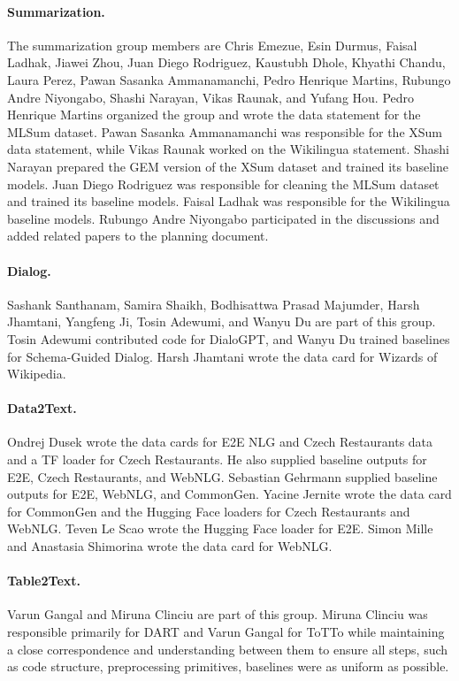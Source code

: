 \documentclass[11pt,a4paper]{article}
\begin{document}
\paragraph{Summarization.}
The summarization group members are Chris Emezue, Esin Durmus, Faisal Ladhak, Jiawei Zhou, Juan Diego Rodriguez, Kaustubh Dhole, Khyathi Chandu, Laura Perez, Pawan Sasanka Ammanamanchi, Pedro Henrique Martins, Rubungo Andre Niyongabo, Shashi Narayan, Vikas Raunak, and Yufang Hou.
Pedro Henrique Martins organized the group and wrote the data statement for the MLSum dataset. Pawan Sasanka Ammanamanchi was responsible for the XSum data statement, while Vikas Raunak worked on the Wikilingua statement. Shashi Narayan prepared the GEM version of the XSum dataset and trained its baseline models. Juan Diego Rodriguez was responsible for cleaning the MLSum dataset and trained its baseline models. Faisal Ladhak was responsible for the Wikilingua baseline models. Rubungo Andre Niyongabo participated in the discussions and added related papers to the planning document.

\paragraph{Dialog.} Sashank Santhanam, Samira Shaikh, Bodhisattwa Prasad Majumder, Harsh Jhamtani, Yangfeng Ji, Tosin Adewumi, and Wanyu Du are part of this group. Tosin Adewumi contributed code for DialoGPT, and Wanyu Du trained baselines for Schema-Guided Dialog. Harsh Jhamtani wrote the data card for Wizards of Wikipedia.

\paragraph{Data2Text.} Ondrej Dusek wrote the data cards for E2E NLG and Czech Restaurants
data and a TF loader for Czech Restaurants. He also supplied baseline outputs for E2E, Czech Restaurants, and WebNLG. Sebastian Gehrmann supplied baseline outputs for E2E, WebNLG, and CommonGen. Yacine Jernite wrote the data card for CommonGen and the Hugging Face loaders for Czech Restaurants and WebNLG. Teven Le Scao wrote the Hugging Face loader for E2E. Simon Mille and Anastasia Shimorina wrote the data card for WebNLG.

\paragraph{Table2Text.} Varun Gangal and Miruna Clinciu are part of this group. Miruna Clinciu was responsible primarily for DART and Varun Gangal for ToTTo while maintaining a close correspondence and understanding between them to ensure all steps, such as code structure, preprocessing primitives, baselines were as uniform as possible. 
\end{document}
